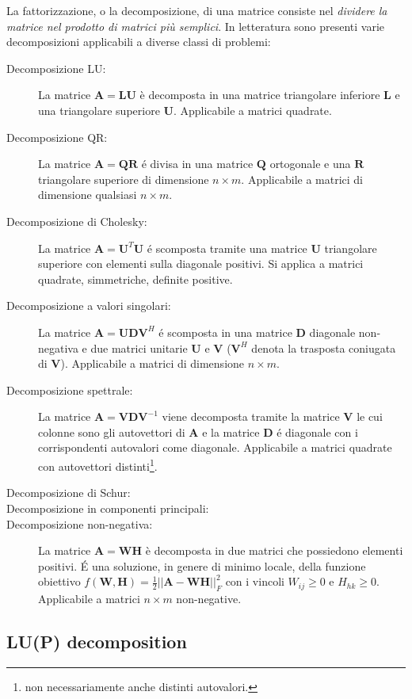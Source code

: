 \documentclass[10pt]{article}
\begin{document}
La fattorizzazione, o la decomposizione, di una matrice consiste nel \emph{dividere la matrice nel prodotto di matrici più semplici}.
In letteratura sono presenti varie decomposizioni applicabili a diverse classi di problemi:
\begin{description}
\item[Decomposizione LU:] La matrice $\mathbf{A}=\mathbf{L}\mathbf{U}$ è decomposta in una matrice triangolare inferiore $\mathbf{L}$ e una triangolare superiore $\mathbf{U}$. Applicabile a matrici quadrate.
\item[Decomposizione QR:] La matrice $\mathbf{A}=\mathbf{Q}\mathbf{R}$ é divisa in una matrice $\mathbf{Q}$ ortogonale e una $\mathbf{R}$ triangolare superiore di dimensione $n\times m$. Applicabile a matrici di dimensione qualsiasi $n\times m$.
\item[Decomposizione di Cholesky:] La matrice $\mathbf{A}=\mathbf{U}^T\mathbf{U}$ é scomposta tramite una matrice $\mathbf{U}$ triangolare superiore con elementi sulla diagonale positivi. Si applica a matrici quadrate, simmetriche, definite positive.
\item[Decomposizione a valori singolari:] La matrice $\mathbf{A}=\mathbf{U}\mathbf{D}\mathbf{V}^H$ é scomposta in una matrice $\mathbf{D}$ diagonale non-negativa e due matrici unitarie $\mathbf{U}$ e $\mathbf{V}$ ($\mathbf{V}^H$ denota la trasposta coniugata di $\mathbf{V}$). Applicabile a matrici di dimensione $n\times m$.
\item[Decomposizione spettrale:] La matrice $\mathbf{A}=\mathbf{V}\mathbf{D}\mathbf{V}^{-1}$ viene decomposta tramite la matrice $\mathbf{V}$ le cui colonne sono gli autovettori di $\mathbf{A}$ e la matrice $\mathbf{D}$ é diagonale con i corrispondenti autovalori come diagonale. Applicabile a matrici quadrate con autovettori distinti\footnote{non necessariamente anche distinti autovalori.}.
\item[Decomposizione di Schur:]
\item[Decomposizione in componenti principali:]
\item[Decomposizione non-negativa:] La matrice $\mathbf{A}=\mathbf{W}\mathbf{H}$ è decomposta in due matrici che possiedono elementi positivi. É una soluzione, in genere di minimo locale, della funzione obiettivo $f(\mathbf{W},\mathbf{H})=\frac{1}{2}||\mathbf{A}-\mathbf{W}\mathbf{H}||^2_F$ con i vincoli $W_{ij} \geq 0$ e $H_{hk}\geq 0$. Applicabile a matrici $n\times m$ non-negative.
\end{description}

\subsection{LU(P) decomposition}
\end{document}
